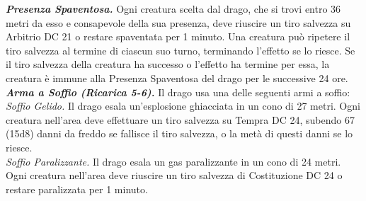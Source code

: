 \begin{multicols}{2}
\emph{\textbf{Presenza Spaventosa.}} Ogni creatura scelta dal drago, che si trovi entro 36 metri da esso e consapevole della sua presenza, deve riuscire un tiro salvezza su Arbitrio DC 21 o restare spaventata per 1 minuto. Una creatura può ripetere il tiro salvezza al termine di ciascun suo turno, terminando l'effetto se lo riesce. Se il tiro salvezza della creatura ha successo o l'effetto ha termine per essa, la creatura è immune alla Presenza Spaventosa del drago per le successive 24 ore.\\
\emph{\textbf{Arma a Soffio (Ricarica 5-6).}} Il drago usa una delle seguenti armi a soffio:\\
\emph{Soffio Gelido.} Il drago esala un'esplosione ghiacciata in un cono di 27 metri. Ogni creatura nell'area deve effettuare un tiro salvezza su Tempra DC 24, subendo 67 (15d8) danni da freddo se fallisce il tiro salvezza, o la metà di questi danni se lo riesce.\\
\emph{Soffio Paralizzante.} Il drago esala un gas paralizzante in un cono di 24 metri. Ogni creatura nell'area deve riuscire un tiro salvezza di Costituzione DC 24 o restare paralizzata per 1 minuto.\\


\end{multicols}
